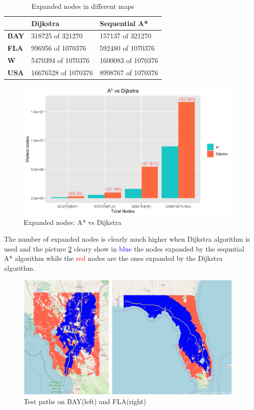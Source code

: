 \documentclass[twocolumn, switch]{article} %
\begin{document}
\begin{table}[ht!]
  \caption{Expanded nodes in different maps}
  \begin{tabular}{|l|l|l|}
  \hline
  \textbf{} & \textbf{Dijkstra} & \textbf{Sequential A*}       \\ \hline
  \textbf{BAY}            & 318725 of 321270    & 157137 of 321270  \\ \hline
  \textbf{FLA}            & 996956 of 1070376   & 592480 of 1070376 \\ \hline
  \textbf{W}              & 5470394 of 1070376  & 1600083 of 1070376 \\ \hline
  \textbf{USA}            & 16676528 of 1070376 & 8998767 of 1070376 \\ \hline
  \end{tabular}
\end{table}
\begin{figure}[ht!]
  \centering
  \includegraphics[width=1\linewidth]{astar_dijkstra/expanded_nodes.png}
  \caption{Expanded nodes: A* vs Dijkstra}
  \label{histogramnodes}
\end{figure}
The number of expanded nodes is clearly much higher when Dijkstra algorithm is used and the picture
\ref{astardijkstramap} cleary show in \textcolor{blue}{blue} the nodes expanded by the sequntial A* algorithm
while the \textcolor{red}{red} nodes are the ones expanded by the Dijkstra algorithm.
\begin{figure}[ht!]
  \centering
  \includegraphics[width=1\linewidth]{astar_dijkstra/dijkstra_astar.png}
  \caption{Test paths on BAY(left) and FLA(right)}
  \label{astardijkstramap}
\end{figure}
\end{document}
